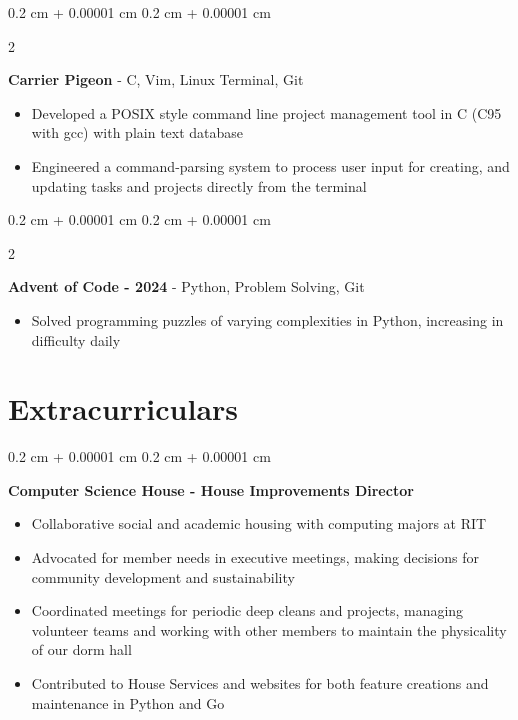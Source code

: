 \documentclass[10pt, letterpaper]{article}
\newenvironment{highlights}{
    \begin{itemize}[
        topsep=0.10 cm,
        parsep=0.10 cm,
        partopsep=0pt,
        itemsep=0pt,
        leftmargin=0.4 cm + 10pt
    ]
}{
    \end{itemize}
} %
\newenvironment{onecolentry}{
    \begin{adjustwidth}{
        0.2 cm + 0.00001 cm
    }{
        0.2 cm + 0.00001 cm
    }
}{
    \end{adjustwidth}
} %
\newenvironment{twocolentry}[2][]{
    \onecolentry
    \def\secondColumn{#2}
    \setcolumnwidth{\fill, 4.5 cm}
    \begin{paracol}{2}
}{
    \switchcolumn \raggedleft \secondColumn
    \end{paracol}
    \endonecolentry
} %
\let\hrefWithoutArrow\href
\renewcommand{\href}[2]{\hrefWithoutArrow{#1}{\ifthenelse{\equal{#2}{}}{ }{#2 }\raisebox{.15ex}{\footnotesize \faExternalLink*}}}
\begin{document}
        
        \begin{twocolentry}{
            \hrefWithoutArrow{https://github.com/shaeespring/CarrierPigeon}{{\footnotesize\faGithub}\hspace*{0.13cm}{shaeespring/CarrierPigeon}}
        }
            \textbf{Carrier Pigeon} - C, Vim, Linux Terminal, Git \begin{highlights}
                \item Developed a POSIX style command line project management tool in C (C95 with gcc) with plain text database
                \item Engineered a command-parsing system to process user input for creating, and updating tasks and projects directly from the terminal
            \end{highlights}
        \end{twocolentry}


        \vspace{0.05 cm}

        \begin{twocolentry}{
            \hrefWithoutArrow{https://github.com/shaeespring/2024-AdventofCode}{{\footnotesize\faGithub}\hspace*{0.13cm}{shaeespring/2024-AdventofCode}}
        }
            \textbf{Advent of Code - 2024} - Python, Problem Solving, Git \begin{highlights}
                \item Solved programming puzzles of varying complexities in Python, increasing in difficulty daily
            \end{highlights}
        \end{twocolentry}


    \endgroup
    \section{\large\bfseries Extracurriculars}

        \begingroup
        \small


        
        \begin{onecolentry}
            \textbf{Computer Science House - House Improvements Director}
            \begin{highlights}
                \item Collaborative social and academic housing with computing majors at RIT
                \item Advocated for member needs in executive meetings, making decisions for community development and sustainability
                \item Coordinated meetings for periodic deep cleans and projects, managing volunteer teams and working with other members to maintain the physicality of our dorm hall
                \item Contributed to House Services and websites for both feature creations and maintenance in Python and Go
            \end{highlights}
        \end{onecolentry}
\end{document}

